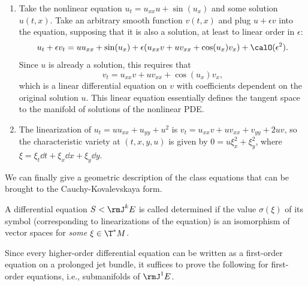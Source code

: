 \begin{example}
    \begin{enumerate}
        \item Take the nonlinear equation $u_t=u_{xx}u+\sin(u_x)$ and some solution $u(t,x)$. Take an arbitrary smooth function $v(t,x)$ and plug $u+\epsilon v$ into the equation, supposing that it is also a solution, at least to linear order in $\epsilon$:
        \[u_t+\epsilon v_t=u u_{xx}+\sin(u_x)+\epsilon(u_{xx}v+uv_{xx}+\cos(u_x)v_x)+\calO(\epsilon^2).\]
        Since $u$ is already a solution, this requires that 
        \[v_t=u_{xx}v+uv_{xx}+\cos(u_x)v_x,\]
        which is a linear differential equation on $v$ with coefficients dependent on the original solution $u$. This linear equation essentially defines the tangent space to the manifold of solutions of the nonlinear PDE.
        \item The linearization of $u_t=uu_{xx}+u_{yy}+u^2$ is $v_t=u_{xx}v+uv_{xx}+v_{yy}+2uv$, so the characteristic variety at $(t,x,y,u)$ is given by $0=u\xi_x^2+\xi_y^2$, where $\xi=\xi_t \dd t+\xi_x\dd x+\xi_y\dd y$.
    \end{enumerate}
\end{example}

We can finally give a geometric description of the class equations that can be brought to the Cauchy-Kovalevskaya form.

\begin{defn}
    A differential equation $S<\rmJ^k E$ is called determined if the value  $\sigma(\xi)$ of its symbol (corresponding to linearizations of the equation) is an isomorphism of vector spaces for \emph{some} $\xi\in \T^\ast M$.
\end{defn}

Since every higher-order differential equation can be written as a first-order equation on a prolonged jet bundle, it suffices to prove the following for first-order equations, i.e., submanifolds of $\rmJ^1E$.


